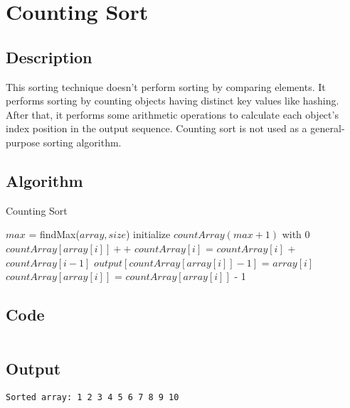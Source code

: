 \section{Counting Sort}

\subsection{Description}
This sorting technique doesn't perform sorting by comparing elements. It performs sorting by counting objects having distinct key values like hashing. After that, it performs some arithmetic operations to calculate each object's index position in the output sequence. Counting sort is not used as a general-purpose sorting algorithm.


\subsection{Algorithm}


\begin{algorithm}[H]
    \caption{Counting Sort}
    \begin{algorithmic}[1]
        \State $max$ = findMax($array, size$)
        \State initialize $countArray(max + 1)$ with 0
        \State $countArray[array[i]]++$
        \EndFor
        \State $countArray[i]$ = $countArray[i]$ + $countArray[i - 1]$
        \EndFor
        \State $output[countArray[array[i]] - 1]$ = $array[i]$
        \State $countArray[array[i]]$ = $countArray[array[i]]$ - 1
        \EndFor
        \EndProcedure
    \end{algorithmic}
\end{algorithm}

\subsection{Code}

\inputminted[fontsize=\footnotesize,bgcolor=bg,linenos,autogobble,frame=single,framerule=0.01pt,rulecolor=FSBorder,stripall]{c++}{code/count.cpp}

\subsection{Output}

\begin{lstlisting}[style=output]
Sorted array: 1 2 3 4 5 6 7 8 9 10
\end{lstlisting}